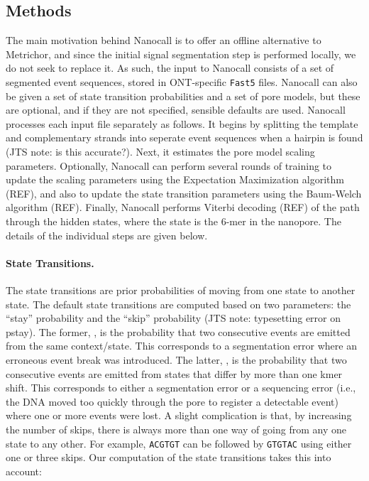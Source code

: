 \documentclass{bioinfo}
\begin{document}

\begin{methods}
\section{Methods}

The main motivation behind Nanocall is to offer an offline alternative to Metrichor, and since the initial signal segmentation step is performed locally, we do not seek to replace it. As such, the input to Nanocall consists of a set of segmented event sequences, stored in ONT-specific \texttt{Fast5} files. Nanocall can also be given a set of state transition probabilities and a set of pore models, but these are optional, and if they are not specified, sensible defaults are used. Nanocall processes each input file separately as follows. It begins by splitting the template and complementary strands into seperate event sequences when a hairpin is found (JTS note: is this accurate?). Next, it estimates the pore model scaling parameters. Optionally, Nanocall can perform several rounds of training to update the scaling parameters using the Expectation Maximization algorithm (REF), and also to update the state transition parameters using the Baum-Welch algorithm (REF). Finally, Nanocall performs Viterbi decoding (REF) of the path through the hidden states, where the state is the 6-mer in the nanopore. The details of the individual steps are given below.

\paragraph{State Transitions.}

The state transitions are prior probabilities of moving from one state to another state. The default state transitions are computed based on two parameters: the ``stay'' probability \pstay and the ``skip'' probability \pskip (JTS note: typesetting error on pstay). The former, \pstay, is the probability that two consecutive events are emitted from the same context/state. This corresponds to a segmentation error where an erroneous event break was introduced. The latter, \pskip, is the probability that two consecutive events are emitted from states that differ by more than one kmer shift. This corresponds to either a segmentation error or a sequencing error (i.e., the DNA moved too quickly through the pore to register a detectable event) where one or more events were lost. A slight complication is that, by increasing the number of skips, there is always more than one way of going from any one state to any other. For example, \texttt{ACGTGT} can be followed by \texttt{GTGTAC} using either one or three skips. Our computation of the state transitions takes this into account:


\end{methods}
\end{document}
